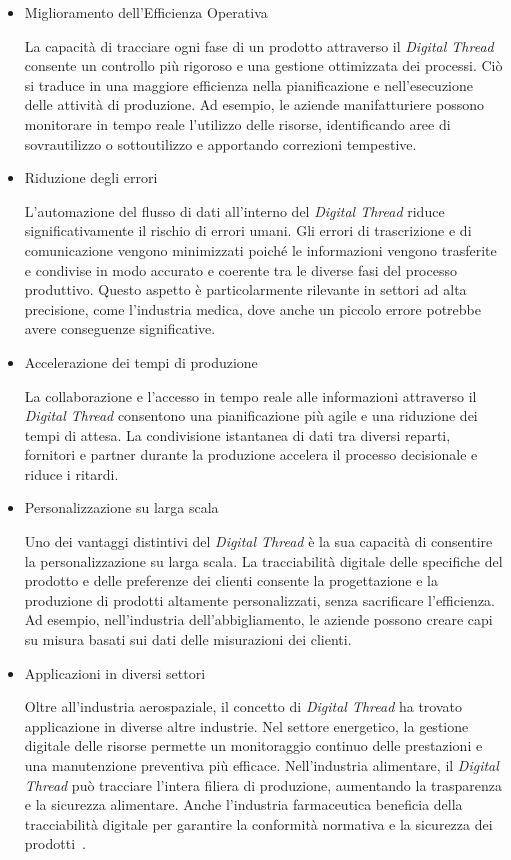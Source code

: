 \begin{itemize}
    \item Miglioramento dell'Efficienza Operativa

    La capacità di tracciare ogni fase di un prodotto attraverso il \emph{Digital Thread} consente un controllo più rigoroso e una gestione ottimizzata dei processi. Ciò si traduce in una maggiore efficienza nella pianificazione e nell'esecuzione delle attività di produzione. Ad esempio, le aziende manifatturiere possono monitorare in tempo reale l'utilizzo delle risorse, identificando aree di sovrautilizzo o sottoutilizzo e apportando correzioni tempestive.

    \item Riduzione degli errori
    
    L'automazione del flusso di dati all'interno del \emph{Digital Thread} riduce significativamente il rischio di errori umani. Gli errori di trascrizione e di comunicazione vengono minimizzati poiché le informazioni vengono trasferite e condivise in modo accurato e coerente tra le diverse fasi del processo produttivo. Questo aspetto è particolarmente rilevante in settori ad alta precisione, come l'industria medica, dove anche un piccolo errore potrebbe avere conseguenze significative.

    \item Accelerazione dei tempi di produzione

    La collaborazione e l'accesso in tempo reale alle informazioni attraverso il \emph{Digital Thread} consentono una pianificazione più agile e una riduzione dei tempi di attesa. La condivisione istantanea di dati tra diversi reparti, fornitori e partner durante la produzione accelera il processo decisionale e riduce i ritardi.

    \item Personalizzazione su larga scala

    Uno dei vantaggi distintivi del \emph{Digital Thread} è la sua capacità di consentire la personalizzazione su larga scala. La tracciabilità digitale delle specifiche del prodotto e delle preferenze dei clienti consente la progettazione e la produzione di prodotti altamente personalizzati, senza sacrificare l'efficienza. Ad esempio, nell'industria dell'abbigliamento, le aziende possono creare capi su misura basati sui dati delle misurazioni dei clienti.
    
    \item Applicazioni in diversi settori
    
    Oltre all'industria aerospaziale, il concetto di \emph{Digital Thread} ha trovato applicazione in diverse altre industrie. Nel settore energetico, la gestione digitale delle risorse permette un monitoraggio continuo delle prestazioni e una manutenzione preventiva più efficace. Nell'industria alimentare, il \emph{Digital Thread} può tracciare l'intera filiera di produzione, aumentando la trasparenza e la sicurezza alimentare. Anche l'industria farmaceutica beneficia della tracciabilità digitale per garantire la conformità normativa e la sicurezza dei prodotti~\cite{Thread5}.
    
\end{itemize}

